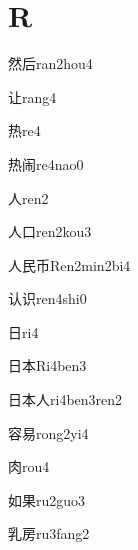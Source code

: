 ﻿%
\section*{R}

\begin{verbete}[12;6]{然后}{ran2hou4}
\end{verbete}

\begin{verbete}[5]{让}{rang4}
\end{verbete}

\begin{verbete}[10]{热}{re4}
\end{verbete}

\begin{verbete}[10;8]{热闹}{re4nao0}
\end{verbete}

\begin{verbete}[2]{人}{ren2}
\end{verbete}

\begin{verbete}[2;3]{人口}{ren2kou3}
\end{verbete}

\begin{verbete}[2;5;4]{人民币}{Ren2min2bi4}
\end{verbete}

\begin{verbete}[4;7]{认识}{ren4shi0}
\end{verbete}

\begin{verbete}[4]{日}{ri4}
\end{verbete}

\begin{verbete}[4;5]{日本}{Ri4ben3}
\end{verbete}

\begin{verbete}[4;5;2]{日本人}{ri4ben3ren2}
\end{verbete}

\begin{verbete}[10;8]{容易}{rong2yi4}
\end{verbete}

\begin{verbete}[6]{肉}{rou4}
\end{verbete}

\begin{verbete}[6;8]{如果}{ru2guo3}
\end{verbete}

\begin{verbete}[8;8]{乳房}{ru3fang2}
\end{verbete}

